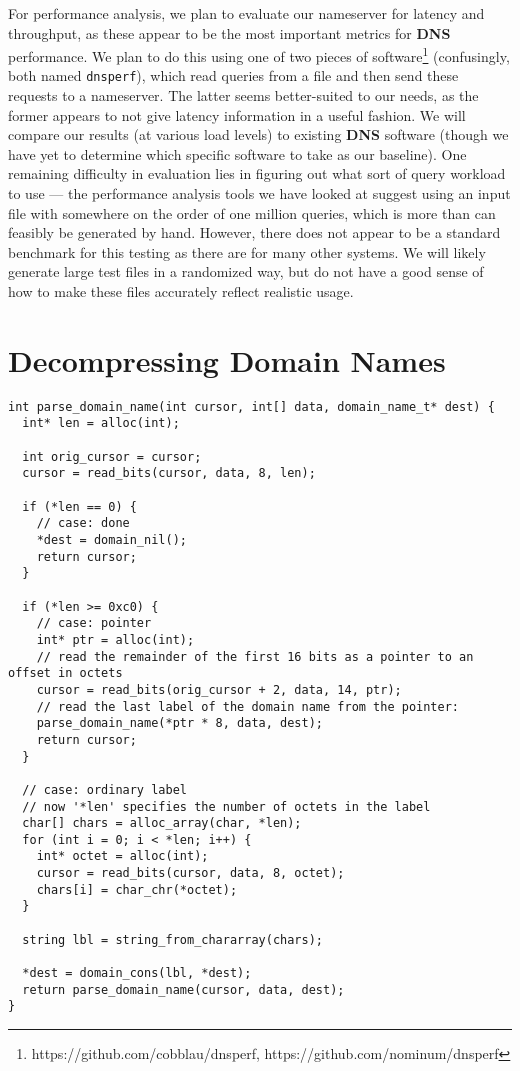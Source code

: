 \documentclass{article}
\newcommand\Kwd[1]{{\sffamily\bfseries{#1}}}
\begin{document}
For performance analysis, we plan to evaluate our nameserver for latency and throughput, as these appear to be the most important metrics for \Kwd{DNS} performance. We plan to do this using one of two pieces of software\footnote{https://github.com/cobblau/dnsperf, https://github.com/nominum/dnsperf} (confusingly, both named \texttt{dnsperf}), which read queries from a file and then send these requests to a nameserver. The latter seems better-suited to our needs, as the former appears to not give latency information in a useful fashion. We will compare our results (at various load levels) to existing \Kwd{DNS} software (though we have yet to determine which specific software to take as our baseline). One remaining difficulty in evaluation lies in figuring out what sort of query workload to use --- the performance analysis tools we have looked at suggest using an input file with somewhere on the order of one million queries, which is more than can feasibly be generated by hand. However, there does not appear to be a standard benchmark for this testing as there are for many other systems. We will likely generate large test files in a randomized way, but do not have a good sense of how to make these files accurately reflect realistic usage.


\nocite{rfc:1034, rfc:1035}



\clearpage
\appendix
\section{Decompressing Domain Names}\label{appendix:decompression}

\begin{lstlisting}
int parse_domain_name(int cursor, int[] data, domain_name_t* dest) {
  int* len = alloc(int);

  int orig_cursor = cursor;
  cursor = read_bits(cursor, data, 8, len);

  if (*len == 0) {
    // case: done
    *dest = domain_nil();
    return cursor;
  }

  if (*len >= 0xc0) {
    // case: pointer
    int* ptr = alloc(int);
    // read the remainder of the first 16 bits as a pointer to an offset in octets
    cursor = read_bits(orig_cursor + 2, data, 14, ptr);
    // read the last label of the domain name from the pointer:
    parse_domain_name(*ptr * 8, data, dest);
    return cursor;
  }

  // case: ordinary label
  // now '*len' specifies the number of octets in the label
  char[] chars = alloc_array(char, *len);
  for (int i = 0; i < *len; i++) {
    int* octet = alloc(int);
    cursor = read_bits(cursor, data, 8, octet);
    chars[i] = char_chr(*octet);
  }

  string lbl = string_from_chararray(chars);

  *dest = domain_cons(lbl, *dest);
  return parse_domain_name(cursor, data, dest);
}
\end{lstlisting}
\end{document}
